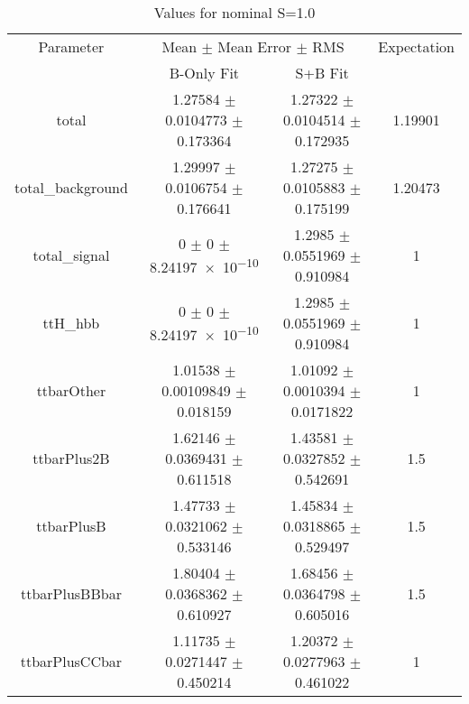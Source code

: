 \begin{table}
\centering
\caption{Values for nominal S=1.0}
\begin{tabular}{cccc}
\toprule
Parameter & \multicolumn{2}{c}{Mean $\pm$ Mean Error $\pm$ RMS} & Expectation\\
 & B-Only Fit & S+B Fit & \\
\midrule
total & \num{1.27584} $\pm$ \num{0.0104773} $\pm$ \num{0.173364} & \num{1.27322} $\pm$ \num{0.0104514} $\pm$ \num{0.172935} & \num{1.19901}\\
total\_background & \num{1.29997} $\pm$ \num{0.0106754} $\pm$ \num{0.176641} & \num{1.27275} $\pm$ \num{0.0105883} $\pm$ \num{0.175199} & \num{1.20473}\\
total\_signal & \num{0} $\pm$ \num{0} $\pm$ \num{8.24197e-10} & \num{1.2985} $\pm$ \num{0.0551969} $\pm$ \num{0.910984} & \num{1}\\
ttH\_hbb & \num{0} $\pm$ \num{0} $\pm$ \num{8.24197e-10} & \num{1.2985} $\pm$ \num{0.0551969} $\pm$ \num{0.910984} & \num{1}\\
ttbarOther & \num{1.01538} $\pm$ \num{0.00109849} $\pm$ \num{0.018159} & \num{1.01092} $\pm$ \num{0.0010394} $\pm$ \num{0.0171822} & \num{1}\\
ttbarPlus2B & \num{1.62146} $\pm$ \num{0.0369431} $\pm$ \num{0.611518} & \num{1.43581} $\pm$ \num{0.0327852} $\pm$ \num{0.542691} & \num{1.5}\\
ttbarPlusB & \num{1.47733} $\pm$ \num{0.0321062} $\pm$ \num{0.533146} & \num{1.45834} $\pm$ \num{0.0318865} $\pm$ \num{0.529497} & \num{1.5}\\
ttbarPlusBBbar & \num{1.80404} $\pm$ \num{0.0368362} $\pm$ \num{0.610927} & \num{1.68456} $\pm$ \num{0.0364798} $\pm$ \num{0.605016} & \num{1.5}\\
ttbarPlusCCbar & \num{1.11735} $\pm$ \num{0.0271447} $\pm$ \num{0.450214} & \num{1.20372} $\pm$ \num{0.0277963} $\pm$ \num{0.461022} & \num{1}\\
\bottomrule
\end{tabular}
\end{table}